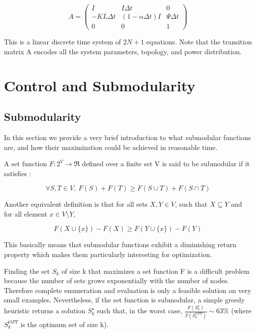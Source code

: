 \documentclass[10pt,twoside%
                ,draft%
        ]{article}
\begin{document}
\begin{equation}
 A =   \left( \begin{array}{ccc} I & I \Delta t & 0 \\ -KL \Delta t & (1-\alpha \Delta t)I & \Psi \Delta t \\ 0&0&1 \end{array} \right)
\end{equation}

This is a linear discrete time system of $ 2 N + 1 $ equations. Note that the transition matrix A encodes all the system parameters, topology, and power distribution.


\section{Control and Submodularity}

\subsection{Submodularity}

In this section we provide a very brief introduction to what submodular functions are, and how their maximization could be achieved in reasonable time.

 A set function $ F:2^{V} \longrightarrow \Re $ defined over a finite set V is said to be submodular if it satisfies :

\begin{equation}
\forall S,T \in V,\ F(S) + F(T) \geq F(S \cup T) + F(S \cap T)
\end{equation}

Another equivalent definition is that for all sets $ X, Y \in V$, such that $ X \subseteq Y$ and for all element $ x \in V \setminus Y$,

\begin{equation}
F(X \cup \{ x \} ) - F(X) \geq F(Y \cup \{ x \} ) - F(Y)
\end{equation} 

This basically means that submodular functions exhibit a diminishing return property which makes them particularly interesting for optimization.

Finding the set $ S_k $ of size k that maximizes a set function F is a difficult problem because the number of sets grows exponentially with the number of nodes. Therefore complete enumeration and evaluation is only a feasible solution on very small examples. Nevertheless, if the set function is submodular, a simple greedy heuristic returns a solution $ S_k^{\star} $ such that, in the worst case, $ \frac{F(S_k^{\star})}{F(S_k^{OPT})} \sim 63\%$ (where $ S_k^{OPT}$ is the optimum set of size k). 
\end{document}
